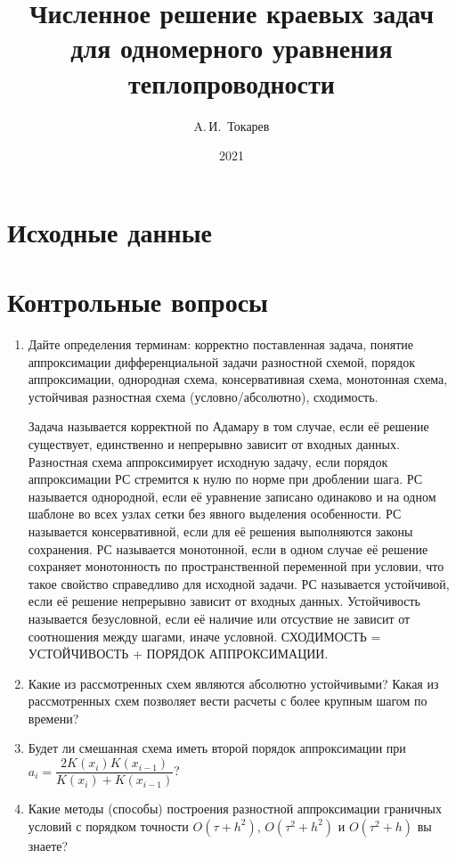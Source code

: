 \documentclass[12pt, a4paper]{article}
\title{Численное решение краевых задач для одномерного уравнения теплопроводности}
\author{A.\,И.~Токарев}
\date{2021}
\begin{document}
\maketitle
\tableofcontents 
\newpage

\section{Исходные данные}



\newpage
\section{Контрольные вопросы}
\begin{enumerate}
\item Дайте определения терминам: корректно поставленная задача, понятие аппроксимации дифференциальной задачи разностной схемой, порядок аппроксимации, однородная схема, консервативная схема, монотонная схема, устойчивая разностная схема (условно/абсолютно), сходимость.

Задача называется корректной по Адамару в том случае, если её решение существует, единственно и непрерывно зависит от входных данных. Разностная схема аппроксимирует исходную задачу, если порядок аппроксимации РС стремится к нулю по норме при дроблении шага. РС называется однородной, если её уравнение записано одинаково и на одном шаблоне во всех узлах сетки без явного выделения особенности. РС называется консервативной, если для её решения выполняются законы сохранения. РС называется монотонной, если в одном случае её решение сохраняет монотонность по пространственной переменной при условии, что такое свойство справедливо для исходной задачи. РС называется устойчивой, если её решение непрерывно зависит от входных данных. Устойчивость называется безусловной, если её наличие или отсуствие не зависит от соотношения между шагами, иначе условной. СХОДИМОСТЬ = УСТОЙЧИВОСТЬ + ПОРЯДОК АППРОКСИМАЦИИ.

\item Какие из рассмотренных схем являются абсолютно устойчивыми? Какая из рассмотренных схем позволяет вести расчеты с более крупным шагом по времени?



\item Будет ли смешанная схема иметь второй порядок аппроксимации при $a_i = \dfrac{2 K(x_i)K(x_{i-1})}{K(x_i) + K(x_{i-1})}$?

\item Какие методы (способы) построения разностной аппроксимации граничных условий с порядком точности $O(\tau + h^2)$, $O(\tau^2 +h^2)$ и $O(\tau^2 + h)$ вы знаете?


\end{enumerate}
\end{document}
